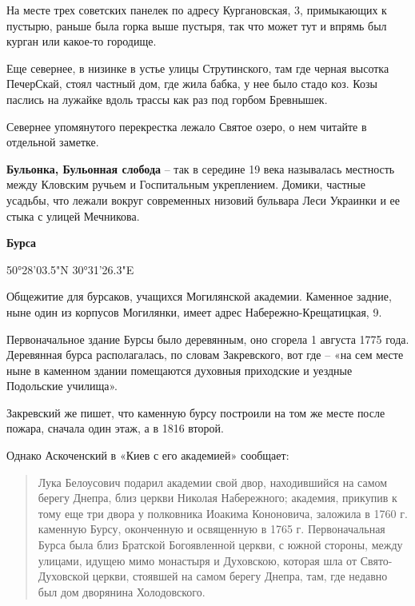 На месте трех советских панелек по адресу Кургановская, 3, примыкающих к пустырю, раньше была горка выше пустыря, так что может тут и впрямь был курган или какое-то городище.

Еще севернее, в низинке в устье улицы Струтинского, там где черная высотка ПечерСкай, стоял частный дом, где жила бабка, у нее было стадо коз. Козы паслись на лужайке вдоль трассы как раз под горбом Бревнышек.

Севернее упомянутого перекрестка лежало Святое озеро, о нем читайте в отдельной заметке.\\

\medskip


\textbf{Бульонка, Бульонная слобода} – так в середине 19 века называлась местность между Кловским ручьем и Госпитальным укреплением. Домики, частные усадьбы, что лежали вокруг современных низовий бульвара Леси Украинки и ее стыка с улицей Мечникова.\\

\medskip

\textbf{Бурса} 

50°28'03.5"N 30°31'26.3"E

Общежитие для бурсаков, учащихся Могилянской академии. Каменное задние, ныне один из корпусов Могилянки, имеет адрес Набережно-Крещатицкая, 9. 

Первоначальное здание Бурсы было деревянным, оно сгорела 1 августа 1775 года. Деревянная бурса располагалась, по словам Закревского, вот где – «на сем месте ныне в каменном здании помещаются духовныя приходские и уездные Подольские училища». 

Закревский же пишет, что каменную бурсу построили на том же месте после пожара, сначала один этаж, а в 1816 второй.

Однако Аскоченский в «Киев с его академией» сообщает:

\begin{quotation}
Лука Белоусович подарил академии свой двор, находившийся на самом берегу Днепра, близ церкви Николая Набережного; академия, прикупив к тому еще три двора у полковника Иоакима Кононовича, заложила в 1760 г. каменную Бурсу, оконченную и освященную в 1765 г. Первоначальная Бурса была близ Братской Богоявленной церкви, с южной стороны, между улицами, идущею мимо монастыря и Духовскою, которая шла от Свято-Духовской церкви, стоявшей на самом берегу Днепра, там, где недавно был дом дворянина Холодовского.\end{quotation}

\medskip

